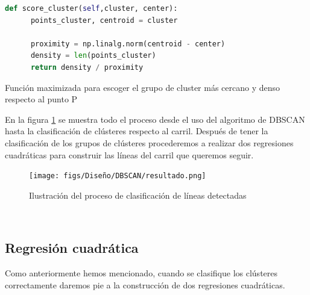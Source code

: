 \begin{code}[h]
  \begin{lstlisting}[language=Python]
    def score_cluster(self,cluster, center):
      points_cluster, centroid = cluster
    
      proximity = np.linalg.norm(centroid - center)
      density = len(points_cluster)
      return density / proximity

  \end{lstlisting}
  \caption[Función maximizada para escoger el grupo de cluster más cercano y denso respecto al punto P]{Función maximizada para escoger el grupo de cluster más cercano y denso respecto al punto P}
  \label{cod:codejemplo}
  \end{code}  

  En la figura \ref{fig:DBSCAN_imagen} se muestra todo el proceso desde el uso del algoritmo de DBSCAN hasta la clasificación de clústeres respecto al carril. 
  Después de tener la clasificación de los grupos de clústeres procederemos a realizar dos regresiones cuadráticas para construir las líneas del carril que queremos seguir.

\begin{figure} [H]
  \begin{center}
    \texttt{[image: figs/Diseño/DBSCAN/resultado.png]}
  \end{center}
  \caption{Ilustración del proceso de clasificación de líneas detectadas}
  \label{fig:DBSCAN_imagen}
\end{figure}\

\subsection{Regresión cuadrática}
\label{sec:Regresión cuadrática}
Como anteriormente hemos mencionado, cuando se clasifique los clústeres correctamente daremos pie a la construcción de dos regresiones cuadráticas. \newline 

